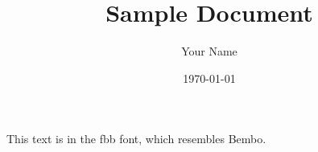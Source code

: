 \documentclass{article}
\begin{document}
\title{Sample Document}
\author{Your Name}
\date{\today}
\maketitle
This text is in the fbb font, which resembles Bembo.
\end{document}
